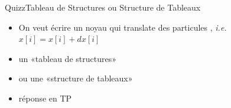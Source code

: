 \documentclass[11pt,mathserif]{beamer}
\newcommand{\scout}{\faAngellist}
\newcommand{\galde}{\faQuestion}
\newcommand{\hand}{\faHandORight}
\newcommand{\argi}{\faLightbulbO}
\newcommand{\kontuz}{\faExclamationTriangle}
\newcommand{\pozik}{\faSmileO}
\newcommand{\adibi}{\faCommentO}
\newcommand{\mylang}{c}
\newcommand{\extlang}{c}
\newcommand{\mylang}{fortran}
\newcommand{\extlang}{f90}
\newcommand{\includeSrc}[1]{}
\begin{document}
\begin{frame}{Quizz}{Tableau de Structures ou Structure de Tableaux}
  \begin{itemize}[<+->]
    \item[\adibi] On veut écrire un noyau qui translate des particules , {\em i.e. }  $x[i] = x[i] + dx[i]$
    \item[\galde] un «tableau de structures»
\begin{center}
  \includeSrc{code/AOS}
\end{center}
    \item[\galde] ou une «structure de tableaux»
\begin{center}
  \includeSrc{code/SOA}
\end{center}
  \item[\hand] réponse en TP \pozik
  \end{itemize}
\end{frame}
%
%  
%  
%
\end{document}
